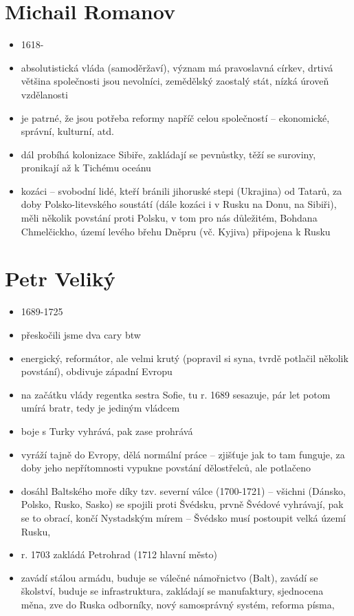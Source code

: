 \documentclass{article}
\begin{document}
\section{Michail Romanov}
\begin{itemize}
  \item 1618-
  \item absolutistická vláda (samoděržaví), význam má pravoslavná církev, drtivá většina společnosti jsou nevolníci, zemědělský zaostalý stát, nízká úroveň vzdělanosti
  \item je patrné, že jsou potřeba reformy napříč celou společností -- ekonomické, správní, kulturní, atd.
  \item dál probíhá kolonizace Sibiře, zakládají se pevnůstky, těží se suroviny, pronikají až k Tichému oceánu
  \item kozáci -- svobodní lidé, kteří bránili jihoruské stepi (Ukrajina) od Tatarů, za doby Polsko-litevského soustátí (dále kozáci i v Rusku na Donu, na Sibiři), měli několik povstání proti Polsku, v tom pro nás důležitém, Bohdana Chmelčickho, území levého břehu Dněpru (vč. Kyjiva) připojena k Rusku
\end{itemize}

\section{Petr Veliký}
\begin{itemize}
  \item 1689-1725
  \item přeskočili jsme dva cary btw
  \item energický, reformátor, ale velmi krutý (popravil si syna, tvrdě potlačil několik povstání), obdivuje západní Evropu
  \item na začátku vlády regentka sestra Sofie, tu r. 1689 sesazuje, pár let potom umírá bratr, tedy je jediným vládcem
  \item boje s Turky vyhrává, pak zase prohrává
  \item vyráží tajně do Evropy, dělá normální práce -- zjišťuje jak to tam funguje, za doby jeho nepřítomnosti vypukne povstání dělostřelců, ale potlačeno
  \item dosáhl Baltského moře díky tzv. severní válce (1700-1721) -- všichni (Dánsko, Polsko, Rusko, Sasko) se spojili proti Švédsku, prvně Švédové vyhrávají, pak se to obrací, končí Nystadským mírem -- Švédsko musí postoupit velká území Rusku,
  \item r. 1703 zakládá Petrohrad (1712 hlavní město)
  \item zavádí stálou armádu, buduje se válečné námořnictvo (Balt), zavádí se školství, buduje se infrastruktura, zakládají se manufaktury, sjednocena měna, zve do Ruska odborníky, nový samosprávný systém, reforma písma,
\end{itemize}
\end{document}
